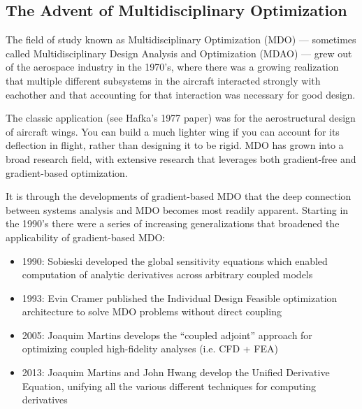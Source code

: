 \documentclass[conf]{new-aiaa}
\begin{document}
    \subsection{The Advent of Multidisciplinary Optimization}

    The field of study known as Multidisciplinary Optimization (MDO) --- sometimes called Multidisciplinary Design Analysis and Optimization (MDAO) --- grew out of the aerospace industry in the 1970's, 
    where there was a growing realization that multiple different subsystems in the aircraft interacted strongly with eachother and that accounting for that interaction was necessary for good design. 

    The classic application (see Hafka's 1977 paper) was for the aerostructural design of aircraft wings. 
    You can build a much lighter wing if you can account for its deflection in flight, rather than designing it to be rigid. 
    MDO has grown into a broad research field, with extensive research that leverages both gradient-free and gradient-based optimization. 

    It is through the developments of gradient-based MDO that the deep connection between systems analysis and MDO becomes most readily apparent. 
    Starting in the 1990's there were a series of increasing generalizations that broadened the applicability of gradient-based MDO: 

    \begin{itemize}[itemsep=1.2em, label={}, itemindent=-2.9em]
        \item 1990: Sobieski developed the global sensitivity equations which enabled computation of analytic derivatives across arbitrary coupled models
        \item 1993: Evin Cramer published the Individual Design Feasible optimization architecture to solve MDO problems without direct coupling
        \item 2005: Joaquim Martins develops the ``coupled adjoint'' approach for optimizing coupled high-fidelity analyses (i.e. CFD + FEA)
        \item 2013: Joaquim Martins and John Hwang develop the Unified Derivative Equation, unifying all the various different techniques for computing derivatives
    \end{itemize}


\end{document}
